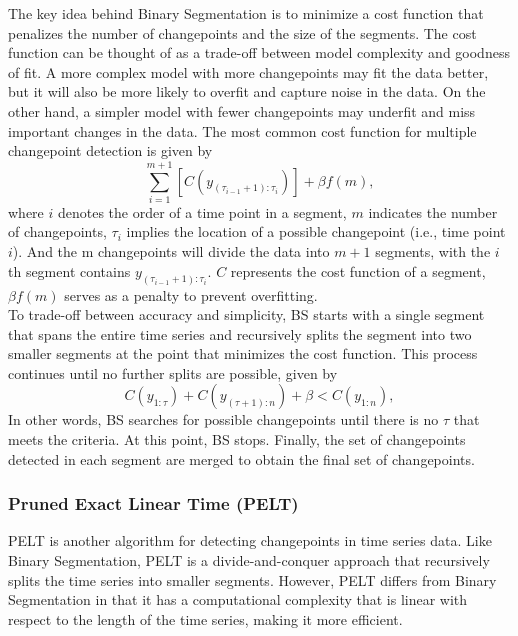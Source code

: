 \documentclass[]{interact}
\theoremstyle{plain}%
\theoremstyle{definition}
\theoremstyle{remark}
\begin{document}
{	The key idea behind Binary Segmentation is to minimize a cost function that penalizes the number of changepoints and the size of the segments. The cost function can be thought of as a trade-off between model complexity and goodness of fit. A more complex model with more changepoints may fit the data better, but it will also be more likely to overfit and capture noise in the data. On the other hand, a simpler model with fewer changepoints may underfit and miss important changes in the data. The most common cost function for multiple changepoint detection is given by
	\begin{equation} \label{4}
		\sum_{i = 1} ^{m + 1} \left[C(y_{({\tau_{i-1} + 1}):\tau_{i}}) \right] + \beta f(m),
	\end{equation}
	where $i$ denotes the order of a time point in a segment, $m$ indicates the number of changepoints, $\tau_i$ implies the location of a possible changepoint (i.e., time point $i$). And the m changepoints will divide the data into $m+1$ segments, with the $i$th segment contains $y_{({\tau_{i-1} + 1}):\tau_{i}}$. $C$ represents the cost function of a segment, $\beta f(m)$ serves as a penalty to prevent overfitting\cite{killickOptimalDetectionChangepoints2012}. \\
	
	To trade-off between accuracy and simplicity, BS starts with a single segment that spans the entire time series and recursively splits the segment into two smaller segments at the point that minimizes the cost function. This process continues until no further splits are possible, given by
	\begin{equation} \label{5}
		C(y_{1:\tau}) + C(y_{({\tau + 1}):n}) + \beta < C(y_{1:n}),
	\end{equation}
	In other words, BS searches for possible changepoints until there is no $\tau$ that meets the criteria. At this point, BS stops. Finally, the set of changepoints detected in each segment are merged to obtain the final set of changepoints.
	
	\subsubsection{Pruned Exact Linear Time (PELT)}
	
	
	\hspace{0.23cm} PELT is another algorithm for detecting changepoints in time series data. Like Binary Segmentation, PELT is a divide-and-conquer approach that recursively splits the time series into smaller segments. However, PELT differs from Binary Segmentation in that it has a computational complexity that is linear with respect to the length of the time series\cite{killickOptimalDetectionChangepoints2012}, making it more efficient. \\
	
}
\end{document}
